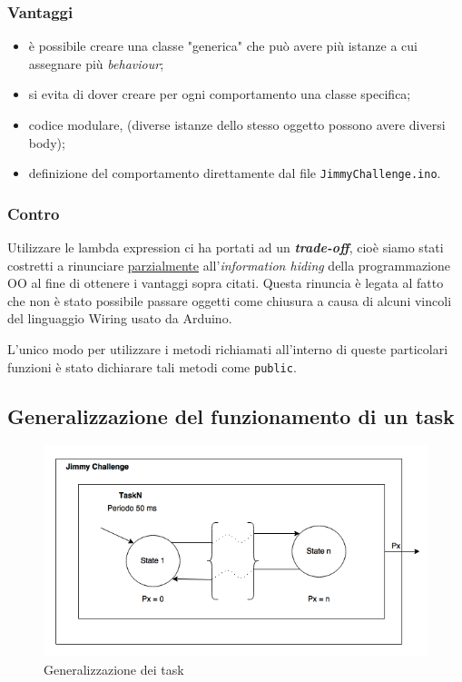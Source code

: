 \subsubsection{Vantaggi}
\begin{itemize}
	\item è possibile creare una classe "generica" che può avere più istanze a cui assegnare più \textit{behaviour};
	\item si evita di dover creare per ogni comportamento una classe specifica;
	\item codice modulare, (diverse istanze dello stesso oggetto possono avere diversi body);
	\item definizione del comportamento direttamente dal file \texttt{JimmyChallenge.ino}.
\end{itemize}

\subsubsection{Contro}
Utilizzare le lambda expression ci ha portati ad un \textbf{\textit{trade-off}}, cioè siamo stati costretti a rinunciare \underline{parzialmente} all'\textit{information hiding} della programmazione OO al fine di ottenere i vantaggi sopra citati. Questa rinuncia è legata al fatto che non è stato possibile passare oggetti come chiusura a causa di alcuni vincoli del linguaggio Wiring usato da Arduino.

L'unico modo per utilizzare i metodi richiamati all'interno di queste particolari funzioni è stato dichiarare tali metodi come \texttt{public}.

\subsection{Generalizzazione del funzionamento di un task}
\begin{figure}[!ht]
	\centering
	\includegraphics[scale=.40]{img/task_generic.png}
	\caption{Generalizzazione dei task}
\end{figure}

